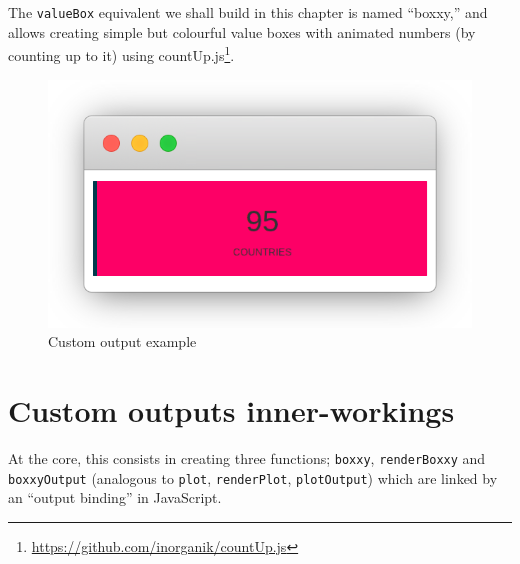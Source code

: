 \documentclass[
]{krantz}
\makeatletter
\newenvironment{Shaded}{\begin{snugshade}}{\end{snugshade}}
\newcommand{\ControlFlowTok}[1]{\textcolor[rgb]{0.27,0.27,0.27}{\textbf{#1}}}
\newcommand{\DecValTok}[1]{\textcolor[rgb]{0.06,0.06,0.06}{#1}}
\newcommand{\KeywordTok}[1]{\textcolor[rgb]{0.27,0.27,0.27}{\textbf{#1}}}
\newcommand{\NormalTok}[1]{#1}
\newcommand{\OperatorTok}[1]{\textcolor[rgb]{0.43,0.43,0.43}{\textbf{#1}}}
\newcommand{\StringTok}[1]{\textcolor[rgb]{0.5,0.5,0.5}{#1}}
\renewcommand{\href}[2]{#2\footnote{\url{#1}}}
\newenvironment{kframe}{%
\medskip{}
\setlength{\fboxsep}{.8em}
 \def\at@end@of@kframe{}%
 \ifinner\ifhmode%
  \def\at@end@of@kframe{\end{minipage}}%
  \begin{minipage}{\columnwidth}%
 \fi\fi%
 \def\FrameCommand##1{\hskip\@totalleftmargin \hskip-\fboxsep
 \colorbox{shadecolor}{##1}\hskip-\fboxsep
     \hskip-\linewidth \hskip-\@totalleftmargin \hskip\columnwidth}%
 \MakeFramed {\advance\hsize-\width
   \@totalleftmargin\z@ \linewidth\hsize
   \@setminipage}}%
 {\par\unskip\endMakeFramed%
 \at@end@of@kframe}
\renewenvironment{Shaded}{\begin{kframe}}{\end{kframe}}
\makeatother
\begin{document}
The \texttt{valueBox} equivalent we shall build in this chapter is named ``boxxy,'' and allows creating simple but colourful value boxes with animated numbers (by counting up to it) using \href{https://github.com/inorganik/countUp.js}{countUp.js}.

\begin{Shaded}
\end{Shaded}

\begin{figure}
\centering
\includegraphics{images/boxxy-example.png}
\caption{Custom output example}
\end{figure}

\hypertarget{custom-outputs-inner-workings}{%
\section{Custom outputs inner-workings}\label{custom-outputs-inner-workings}}

At the core, this consists in creating three functions; \texttt{boxxy}, \texttt{renderBoxxy} and \texttt{boxxyOutput} (analogous to \texttt{plot}, \texttt{renderPlot}, \texttt{plotOutput}) which are linked by an ``output binding'' in JavaScript.
\end{document}
